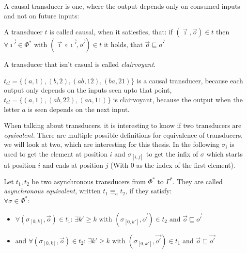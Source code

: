 A causal transducer is one, where the output depends only on consumed inputs and not on future inputs:

\begin{definition}[name = Causal and Clairvoyant Transducers]\label{def:causal_transducer}
  A transducer \(t\) is called causal, when it satiesfies, that:
  if \((\vec{\imath},\vec{o}) \in t \)
  then \( \forall \vec{\imath'} \in \Phi^* \text{ with } (\vec{\imath} \circ \vec{\imath'}, \vec{o'}) \in t \)
  it holds, that \( \vec{o} \sqsubseteq \vec{o'} \)

  A transducer that isn't casual is called \emph{clairvoyant}.
\end{definition}


\begin{exmp}[name = Causal and Clairvoyant Transducers]
  \(t_{cl} = \{(a,1),(b,2),(ab,12),(ba,21)\}\) is a causal transducer, because each output only depends on the inputs seen upto that point, \(t_{cl} = \{(a,1),(ab,22),(aa,11)\}\) is clairvoyant, because the output when the letter \(a\) is seen depends on the next input.
\end{exmp}

When talking about transducers, it is interesting to know if two transducers are \emph{equivalent}.
There are multiple possible definitions for equivalence of transducers, we will look at two, which are interesting for this thesis.
In the following \(\sigma_i\) is used to get the element at position \(i\) and \(\sigma_{[i,j]}\) to get the infix of \(\sigma\) which starts at position \(i\) and ends at position \(j\) (With \(0\) as the index of the first element).

\begin{definition}[name = Asynchronous equivalence of Transducers]\label{def:async_equivalence_transducer}
  Let \(t_1, t_2\) be two asynchronous transducers from \(\Phi^*\) to \(\Gamma^*\).
  They are called \emph{asynchronous equivalent}, written \(t_1 \equiv_a t_2\), if they satisfy: \\
  \(\forall \sigma \in \Phi^*\):
  \begin{itemize}
    \item \(\forall (\sigma_{[0,k]}, \vec{o}) \in t_1\): \(\exists k' \geq k \text{ with } (\sigma_{[0,k']}, \vec{o'}) \in t_2\) and \(\vec{o} \sqsubseteq \vec{o'}\)
    \item and \(\forall (\sigma_{[0,k]}, \vec{o}) \in t_2\): \(\exists k' \geq k \text{ with } (\sigma_{[0,k']}, \vec{o'}) \in t_1\) and \(\vec{o} \sqsubseteq \vec{o'}\)
  \end{itemize}
\end{definition}

